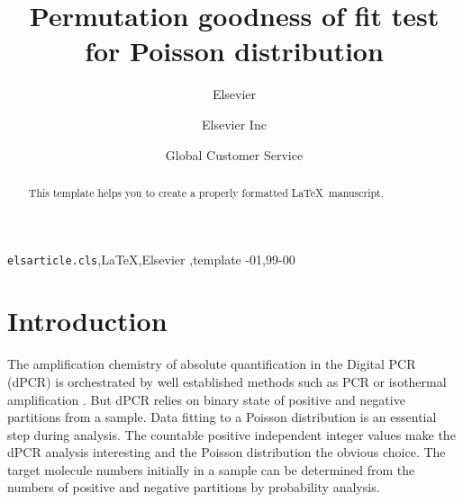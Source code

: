 \documentclass[review]{elsarticle}
\begin{document}
\begin{frontmatter}

\title{Permutation goodness of fit test for Poisson distribution}

\author{Elsevier}
\address{Radarweg 29, Amsterdam}

\author[mymainaddress,mysecondaryaddress]{Elsevier Inc}

\author[mysecondaryaddress]{Global Customer Service}

\address[mymainaddress]{1600 John F Kennedy Boulevard, Philadelphia}
\address[mysecondaryaddress]{360 Park Avenue South, New York}

\begin{abstract}
This template helps you to create a properly formatted \LaTeX\ manuscript.
\end{abstract}

\begin{keyword}
\texttt{elsarticle.cls}\sep \LaTeX\sep Elsevier \sep template
-01\sep  99-00
\end{keyword}

\end{frontmatter}

\linenumbers

\section{Introduction}

The amplification chemistry of absolute quantification in the Digital PCR (dPCR) 
is orchestrated by well established methods such as PCR or isothermal 
amplification \cite{pabinger_survey_2014, morley_digital_2014}. But dPCR relies 
on binary state of positive and negative partitions from a sample. Data fitting 
to a Poisson distribution is an essential step during analysis. The countable 
positive independent integer values make the dPCR analysis interesting and the 
Poisson distribution the obvious choice. The target molecule numbers initially 
in a sample can be determined from the numbers of positive and negative 
partitions by probability analysis.
\end{document}
